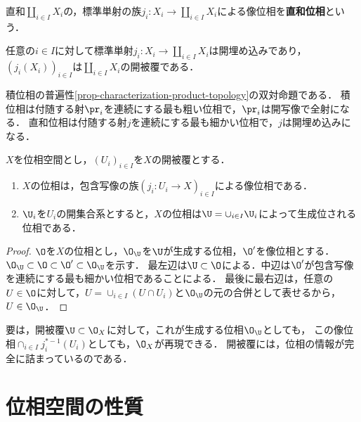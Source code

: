 \documentclass[uplatex,dvipdfmx]{jsreport}
\begin{document}
\begin{definition}
    直和$\coprod_{i\in I}X_i$の，標準単射の族$j_i:X_i\to\coprod_{i\in I}X_i$による像位相を\textbf{直和位相}という．
\end{definition}

\begin{lemma}
    任意の$i\in I$に対して標準単射$j_i:X_i\to\coprod_{i\in I}X_i$は開埋め込みであり，$(j_i(X_i))_{i\in I}$は$\coprod_{i\in I}X_i$の開被覆である．
\end{lemma}
\begin{remarks}
    積位相の普遍性\ref{prop-characterization-product-topology}の双対命題である．
    積位相は付随する射$\pr_i$を連続にする最も粗い位相で，$\pr_i$は開写像で全射になる．
    直和位相は付随する射$j$を連続にする最も細かい位相で，$j$は開埋め込みになる．
\end{remarks}

\begin{proposition}[開被覆の像位相としての見方]
    $X$を位相空間とし，$(U_i)_{i\in I}$を$X$の開被覆とする．
    \begin{enumerate}
        \item $X$の位相は，包含写像の族$(j_i:U_i\to X)_{i\in I}$による像位相である．
        \item $\U_i$を$U_i$の開集合系とすると，$X$の位相は$\U=\cup_{i\in I}\U_i$によって生成位される位相である．
    \end{enumerate}
\end{proposition}
\begin{proof}
    $\O$を$X$の位相とし，$\O_\U$を$\U$が生成する位相，$\O'$を像位相とする．
    $\O_\U\subset\O\subset\O'\subset\O_\U$を示す．
    最左辺は$\U\subset\O$による．中辺は$\O'$が包含写像を連続にする最も細かい位相であることによる．
    最後に最右辺は，任意の$U\in\O$に対して，$U=\cup_{i\in I}(U\cap U_i)$と$\O_\U$の元の合併として表せるから，$U\in\O_\U$．
\end{proof}
\begin{remarks}
    要は，開被覆$\U\subset\O_X$に対して，これが生成する位相$\O_\U$としても，
    この像位相$\cap_{i\in I}j_i^{*-1}(U_i)$としても，$\O_X$が再現できる．
    開被覆には，位相の情報が完全に詰まっているのである．
\end{remarks}

\chapter{位相空間の性質}
\end{document}
